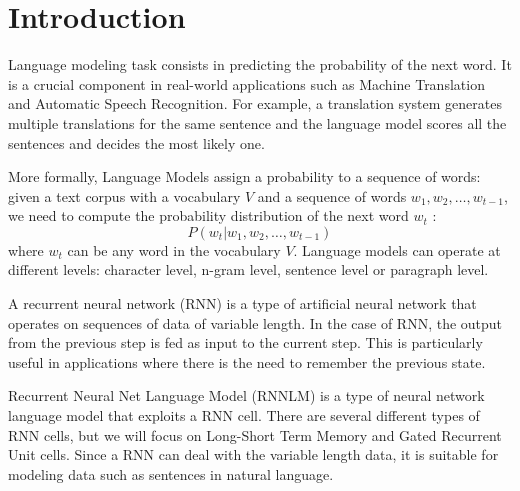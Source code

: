 \section{Introduction}
Language modeling task consists in predicting the probability of the next word.
It is a crucial component in real-world applications such as Machine Translation 
and Automatic Speech Recognition. For example, a translation system generates multiple 
translations for the same sentence and the language model scores all the sentences 
and decides the most likely one.

More formally, Language Models assign a probability to a sequence of words: 
given a text corpus with a vocabulary $V$ and a sequence of words $w_1,w_2, \dots, w_{t-1}$, 
we need to compute the probability distribution of the next word $w_t$ \cite{LM_definition}:
\begin{equation}
    P(w_{t} | w_1, w_2, \dots, w_{t-1})
\end{equation}
where $w_t$ can be any word in the vocabulary $V$.
Language models can operate at different levels: character level, n-gram level, 
sentence level or paragraph level.

A recurrent neural network (RNN) is a type of artificial neural network that 
operates on sequences of data of variable length. In the case of RNN, the output 
from the previous step is fed as input to the current step. This is particularly 
useful in applications where there is the need to remember the previous state.

Recurrent Neural Net Language Model (RNNLM) is a type of neural network language 
model that exploits a RNN cell. There are several different types of RNN cells,
but we will focus on Long-Short Term Memory \cite{LSTM} and Gated Recurrent Unit 
\cite{GRU} cells. Since a RNN can deal with the variable length data, it is 
suitable for modeling data such as sentences in natural language.

